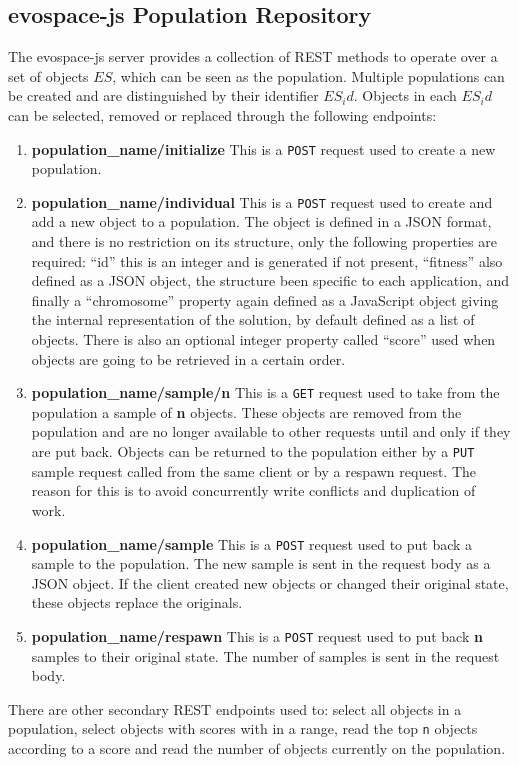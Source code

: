 \subsection{{\sf evospace-js} Population Repository} %
\label{sec:evospace}
The {\sf evospace-js} server provides a collection of REST methods  
to operate over a set of objects $ES$, which can be seen as the 
population. Multiple populations can be created and are 
distinguished by their identifier $ES_id$. Objects in each $ES_id$ 
can be selected, removed or replaced through the 
following endpoints:
\begin{enumerate}
    \item {\bf population\_name/initialize} 
    This is a {\tt POST} request used to create a new population.
    \item {\bf population\_name/individual} 
    This is a {\tt POST} request used to create and add a new object
    to a population. The object is defined in a JSON format, 
    and there is no restriction on its structure, only 
    the following properties are required: ``id'' this is an 
    integer and is generated if not present, ``fitness'' also defined 
    as a JSON object, the structure been specific to each application, 
    and finally a ``chromosome'' property again defined as
    a JavaScript object giving the internal representation of 
    the solution, by default defined as a list of objects. 
    There is also an optional integer property called 
    ``score'' used when objects are going to be retrieved in a certain order.
    \item {\bf population\_name/sample/n}
    This is a {\tt GET}  request used to take from the population a 
    sample of {\bf n} objects. These objects are removed from the 
    population and are no longer available
    to other requests until and only if they are put back. 
    Objects can be returned to the population 
    either by a {\tt PUT} sample request called from the same 
    client or by a respawn request. The reason for 
    this is to avoid concurrently write conflicts and duplication of work.
    \item {\bf population\_name/sample}
    This is a {\tt POST} request used to put back a sample to the population.
    The new sample is sent in the request body as a JSON object. 
    If the client created new objects or 
    changed their original state, these objects replace the originals. 
    \item {\bf population\_name/respawn}
    This is a {\tt POST} request used to put back {\bf n} samples to their 
    original state. The number of samples is sent in the request body. 
\end{enumerate}
There are other secondary REST endpoints used to: select all objects in a 
population, select objects with scores with in a range, read the 
top {\tt n} objects according to a score and read the number of
objects currently on the population.      

